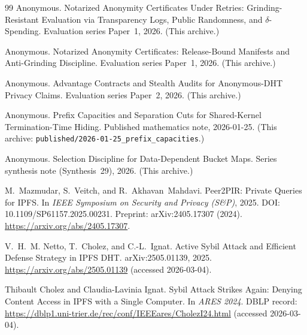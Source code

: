 \documentclass[11pt]{article}
\begin{document}
\begin{thebibliography}{99}
Anonymous.
\newblock Notarized Anonymity Certificates Under Retries: Grinding-Resistant Evaluation via Transparency Logs, Public Randomness, and $\delta$-Spending.
\newblock Evaluation series Paper~1, 2026. (This archive.)

Anonymous.
\newblock Notarized Anonymity Certificates: Release-Bound Manifests and Anti-Grinding Discipline.
\newblock Evaluation series Paper~1, 2026. (This archive.)

Anonymous.
\newblock Advantage Contracts and Stealth Audits for Anonymous-DHT Privacy Claims.
\newblock Evaluation series Paper~2, 2026. (This archive.)


Anonymous.
\newblock Prefix Capacities and Separation Cuts for Shared-Kernel Termination-Time Hiding.
\newblock Published mathematics note, 2026-01-25. (This archive: \texttt{published/2026-01-25\_prefix\_capacities}.)

Anonymous.
\newblock Selection Discipline for Data-Dependent Bucket Maps.
\newblock Series synthesis note (Synthesis~29), 2026. (This archive.)

M.~Mazmudar, S.~Veitch, and R.~Akhavan~Mahdavi.
\newblock Peer2PIR: Private Queries for {IPFS}.
\newblock In \emph{IEEE Symposium on Security and Privacy (S\&P)}, 2025.
\newblock DOI: 10.1109/SP61157.2025.00231.
\newblock Preprint: arXiv:2405.17307 (2024).
\newblock \url{https://arxiv.org/abs/2405.17307}.

V.~H.~M. Netto, T.~Cholez, and C.-L.~Ignat.
\newblock Active Sybil Attack and Efficient Defense Strategy in IPFS DHT.
\newblock arXiv:2505.01139, 2025. \url{https://arxiv.org/abs/2505.01139} (accessed 2026-03-04).

Thibault Cholez and Claudia-Lavinia Ignat.
\newblock Sybil Attack Strikes Again: Denying Content Access in IPFS with a Single Computer.
\newblock In \emph{ARES 2024}. DBLP record: \url{https://dblp1.uni-trier.de/rec/conf/IEEEares/CholezI24.html} (accessed 2026-03-04).

\end{thebibliography}
\end{document}
